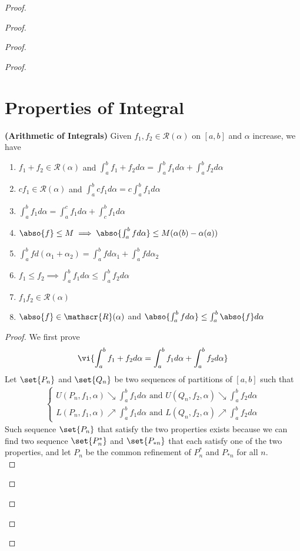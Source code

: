 \documentclass{report}
\begin{document}
\begin{proof}
\begin{proof}
\begin{proof}
\begin{proof}
\section{Properties of Integral}
\begin{theorem}
\label{7.2.1}
\textbf{(Arithmetic of Integrals)} Given $f_1,f_2 \in \mathscr{R}(\alpha )$ on $[a,b]$ and $\alpha $ increase, we have 
\begin{enumerate}[label=(\alph*)]
  \item $f_1+f_2 \in \mathscr{R}(\alpha )$ and $\int_a^b f_1+f_2 d\alpha = \int_a^b f_1 d\alpha  + \int_a^b f_2 d\alpha $
  \item $cf_1 \in \mathscr{R}(\alpha ) $ and $\int_a^b cf_1 d\alpha =c \int_a^b f_1 d\alpha $
  \item  $\int_a^b f_1 d \alpha = \int_a^c f_1 d\alpha +\int_c^b f_1 d\alpha $ 
  \item $\abso{f}\leq M \implies \abso{\int_a^b fd\alpha } \leq M(\alpha (b)-\alpha (a)) $ 
  \item $\int_a^b fd(\alpha _1+\alpha _2)=\int_a^b fd\alpha _1 +\int_a^b fd\alpha_2$ 
  \item $f_1 \leq f_2 \implies \int_a^b f_1 d\alpha  \leq \int_a^b f_2 d\alpha $ 
  \item $f_1f_2 \in \mathscr{R}(\alpha )$
  \item $\abso{f}\in \mathscr{R}(\alpha )$ and $\abso{\int_a^b fd\alpha }\leq  \int_a^b \abso{f}d\alpha $
\end{enumerate}
\end{theorem}
\begin{proof}
We first prove 
\begin{align*}
\vi{\int_a^b f_1 + f_2 d\alpha =\int_a^b f_1 d\alpha +\int_a^b f_2 d\alpha }
\end{align*}
Let $\set{P_n}$ and $\set{Q_n}$ be two sequences of partitions of $[a,b]$ such that 
\begin{align*}
\begin{cases}
  U(P_n,f_1,\alpha ) \searrow   \int_a^b f_1 d\alpha \text{ and } U(Q_n,f_2,\alpha ) \searrow \int_a^b f_2 d\alpha \\
  L(P_n,f_1,\alpha )\nearrow \int_a^b f_1 d\alpha \text{ and }L(Q_n,f_2, \alpha ) \nearrow \int_a^b f_2 d\alpha 
\end{cases}
\end{align*}
Such sequence $\set{P_n}$ that satisfy the two properties exists because we can find two sequence  $\set{P_n^*}$ and $\set{P_{*n}}$ that each satisfy one of the two properties, and let $P_n$ be the common  refinement of $P_n^*$ and  $P_{*n}$ for all $n$.\\


\end{proof}
\end{proof}
\end{proof}
\end{proof}
\end{proof}
\end{document}
